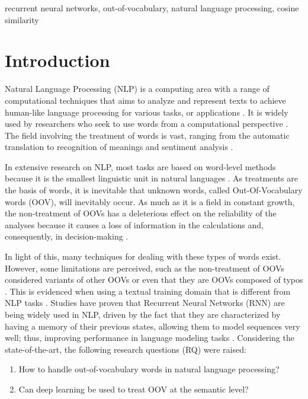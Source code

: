 \documentclass[conference]{IEEEtran}
\begin{document}
\begin{IEEEkeywords}
recurrent neural networks, out-of-vocabulary, natural language processing, cosine similarity
\end{IEEEkeywords}

\section{Introduction}
Natural Language Processing (NLP) is a computing area  with a range of computational techniques that aims to analyze and represent texts to achieve human-like language processing for various tasks, or applications \cite{b1}. It is widely used by researchers who seek to use words from a computational perspective \cite{b2}. The field involving the treatment of words is vast, ranging from the automatic translation to recognition of meanings and sentiment analysis \cite{b1,b23}.

In extensive research on NLP, most tasks are based on word-level methods because it is the smallest linguistic unit in natural languages \cite{b23,b26}. As treatments are the basis of words, it is inevitable that unknown words, called Out-Of-Vocabulary words (OOV), will inevitably occur. As much as it is a field in constant growth, the non-treatment of OOVs has a deleterious effect on the reliability of the analyses because it causes a loss of information in the calculations and, consequently, in decision-making \cite{b4}.

In light of this, many techniques for dealing with these types of words exist. However, some limitations are perceived, such as the non-treatment of OOVs considered variants of other OOVs or even that they are OOVs composed of typos \cite{b16}. This is evidenced when using a textual training domain that is different from NLP tasks \cite{b15}. Studies have proven that Recurrent Neural Networks (RNN) are being widely used in NLP, driven by the fact that they are characterized by having a memory of their previous states, allowing them to model sequences very well; thus, improving performance in language modeling tasks \cite{b4,b5,b26}. Considering the state-of-the-art, the following research questions (RQ) were raised:
\begin{enumerate}
     \item How to handle out-of-vocabulary words in natural language processing?
     \item Can deep learning be used to treat OOV at the semantic level?
\end{enumerate}
\end{document}
